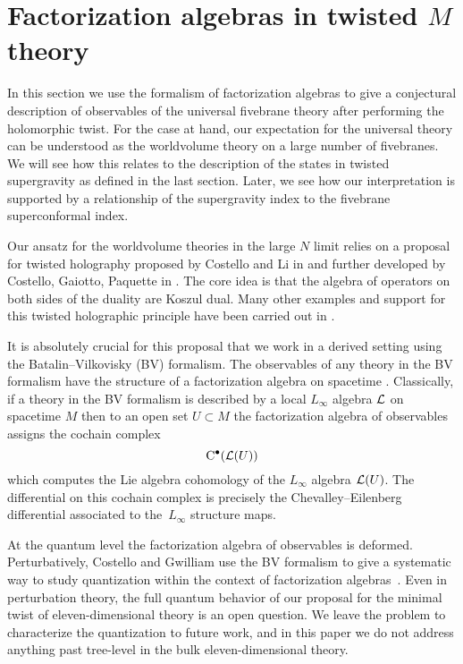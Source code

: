 %
%
%

\section{Factorization algebras in twisted $M$ theory}
\label{s:fact}

In this section we use the formalism of factorization algebras to give a conjectural description of observables of the universal fivebrane theory after performing the holomorphic twist.
For the case at hand, our expectation for the universal theory can be understood as the worldvolume theory on a large number of fivebranes. 
We will see how this relates to the description of the states in twisted supergravity as defined in the last section.
Later, we see how our interpretation is supported by a relationship of the supergravity index to the fivebrane superconformal index.

Our ansatz for the worldvolume theories in the large $N$ limit relies on a proposal for twisted holography proposed by Costello and Li in \cite{CLsugra} and further developed by Costello, Gaiotto, Paquette in \cite{CostelloM2,CostelloM5,costello2021twisted,CP}.
The core idea is that the algebra of operators on both sides of the duality are Koszul dual. 
Many other examples and support for this twisted holographic principle have been carried out in \cite{Oh:2021wes,Oh:2020hph,Gaiotto:2021xce}.

It is absolutely crucial for this proposal that we work in a derived setting using the Batalin--Vilkovisky (BV) formalism. 
The observables of any theory in the BV formalism have the structure of a factorization algebra on spacetime \cite{CG2}. 
Classically, if a theory in the BV formalism is described by a local $L_\infty$ algebra $\mathcal L$ on spacetime $M$ then to an open set $U \subset M$ the factorization algebra of observables assigns the cochain complex
\[
{\rm C}^\bullet(\mathcal L(U))
\]
which computes the Lie algebra cohomology of the $L_\infty$ algebra $\mathcal L(U)$. 
The differential on this cochain complex is precisely the Chevalley--Eilenberg differential associated to the~$L_\infty$ structure maps. 

At the quantum level the factorization algebra of observables is deformed.
Perturbatively, Costello and Gwilliam use the BV formalism to give a systematic way to study quantization within the context of factorization algebras~\cite{CG2}. 
Even in perturbation theory, the full quantum behavior of our proposal for the minimal twist of eleven-dimensional theory is an open question. 
We leave the problem to characterize the quantization to future work, and in this paper we do not address anything past tree-level in the bulk eleven-dimensional theory.

